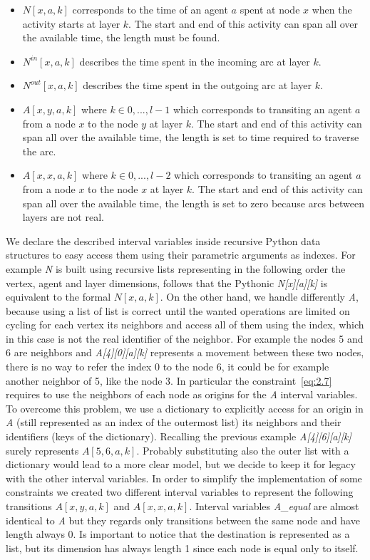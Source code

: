 \documentclass[12pt, a4paper, hidelinks]{article}
\numberwithin{equation}{section}
\begin{document}
\begin{itemize}
\item $N[x,a,k]$ corresponds to the time of an agent $a$ spent at node $x$ when the activity starts at layer $k$.
The start and end of this activity can span all over the available time, the length must be found.
\item $N^{in}[x,a,k]$ describes the time spent in the incoming arc at layer $k$.
\item $N^{out}[x,a,k]$ describes the time spent in the outgoing arc at layer $k$.
\item $A[x,y,a,k]$ where $k \in {0,...,l-1}$ which corresponds to transiting an agent $a$ from a node $x$ to the node $y$ at layer $k$.
The start and end of this activity can span all over the available time, the length is set to time required to traverse the arc.
\item $A[x,x,a,k]$ where $k \in {0,...,l-2}$ which corresponds to transiting an agent $a$ from a node $x$ to the node $x$ at layer $k$.
The start and end of this activity can span all over the available time, the length is set to zero because arcs between layers are not real.
\end{itemize}

We declare the described interval variables inside recursive Python data structures to easy access them using their parametric arguments as indexes.
For example \textit{N} is built using recursive lists representing in the following order the vertex, agent and layer dimensions, follows that the Pythonic \textit{N[x][a][k]} is equivalent to the formal $N[x,a,k]$.
On the other hand, we handle differently \textit{A}, because using a list of list is correct until the wanted operations are limited on cycling for each vertex its neighbors and access all of them using the index, which in this case is not the real identifier of the neighbor.
For example the nodes 5 and 6 are neighbors and \textit{A[4][0][a][k]} represents a movement between these two nodes, there is no way to refer the index 0 to the node 6, it could be for example another neighbor of 5, like the node 3.
In particular the constraint~\ref{eq:2.7} requires to use the neighbors of each node as origins for the \textit{A} interval variables.
To overcome this problem, we use a dictionary to explicitly access for an origin in \textit{A} (still represented as an index of the outermost list) its neighbors and their identifiers (keys of the dictionary).
Recalling the previous example \textit{A[4][6][a][k]} surely represents $A[5,6,a,k]$.
Probably substituting also the outer list with a dictionary would lead to a more clear model, but we decide to keep it for legacy with the other interval variables.
In order to simplify the implementation of some constraints we created two different interval variables to represent the following transitions $A[x,y,a,k]$ and $A[x,x,a,k]$.
Interval variables \textit{A\_equal} are almost identical to \textit{A} but they regards only transitions between the same node and have length always 0.
Is important to notice that the destination is represented as a list, but its dimension has always length 1 since each node is equal only to itself.
\end{document}
